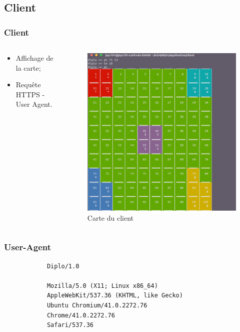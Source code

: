 \subsection{Client}
	\begin{frame}
		\frametitle{Client}
		\begin{columns}
			\begin{column}{5cm}
				\begin{itemize}
					\item Affichage de la carte; \newline
					\item Requête HTTPS - User Agent.
				\end{itemize}
			\end{column}
			\begin{column}{5cm}
				\begin{figure}
					\includegraphics[scale=0.2]{images/carte.png}
					\caption{Carte du client}
				\end{figure}
			\end{column}
		\end{columns}
	\end{frame}
	\begin{frame}[fragile]
		\frametitle{User-Agent}
		\begin{verbatim}
			Diplo/1.0

			Mozilla/5.0 (X11; Linux x86_64) 
			AppleWebKit/537.36 (KHTML, like Gecko) 
			Ubuntu Chromium/41.0.2272.76 
			Chrome/41.0.2272.76 
			Safari/537.36
		\end{verbatim}
	\end{frame}
